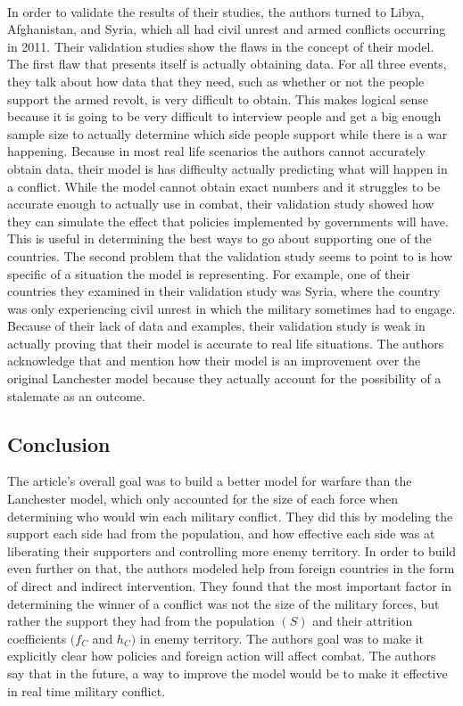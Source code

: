 \documentclass{article}
\begin{document}
\\In order to validate the results of their studies, the authors turned to Libya, Afghanistan, and Syria, which all had civil unrest and armed conflicts occurring in 2011. Their validation studies show the flaws in the concept of their model. The first flaw that presents itself is actually obtaining data. For all three events, they talk about how data that they need, such as whether or not the people support the armed revolt, is very difficult to obtain. This makes logical sense because it is going to be very difficult to interview people and get a big enough sample size to actually determine which side people support while there is a war happening. Because in most real life scenarios the authors cannot accurately obtain data, their model is has difficulty actually predicting what will happen in a conflict. While the model cannot obtain exact numbers and it struggles to be accurate enough to actually use in combat, their validation study showed how they can simulate the effect that policies implemented by governments will have. This is useful in determining the best ways to go about supporting one of the countries. The second problem that the validation study seems to point to is how specific of a situation the model is representing. For example, one of their countries they examined in their validation study was Syria, where the country was only experiencing civil unrest in which the military sometimes had to engage. 
\medskip
\\Because of their lack of data and examples, their validation study is weak in actually proving that their model is accurate to real life situations. The authors acknowledge that and mention how their model is an improvement over the original Lanchester model because they actually account for the possibility of a stalemate as an outcome. 
\subsection{Conclusion}
The article’s overall goal was to build a better model for warfare than the Lanchester model, which only accounted for the size of each force when determining who would win each military conflict. They did this by modeling the support each side had from the population, and how effective each side was at liberating their supporters and controlling more enemy territory. In order to build even further on that, the authors modeled help from foreign countries in the form of direct and indirect intervention. They found that the most important factor in determining the winner of a conflict was not the size of the military forces, but rather the support they had from the population $(S)$ and their attrition coefficients $(f_{C}$ and $h_{C})$ in enemy territory. The authors goal was to make it explicitly clear how policies and foreign action will affect combat. The authors say that in the future, a way to improve the model would be to make it effective in real time military conflict. 
\printbibliography
\end{document}
